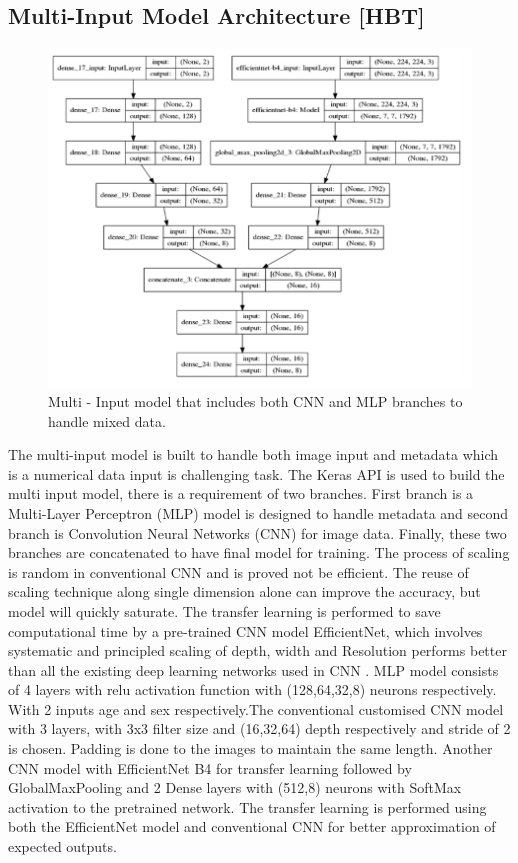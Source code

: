 \subsection{Multi-Input Model Architecture [HBT]}
\begin{figure}[h]
    \centering
    \includegraphics[width=.75\linewidth]{pictures/model.PNG}  
    \caption{Multi - Input model that includes both CNN and MLP branches to handle mixed data.}
    \label{fig:model}
\end{figure}
The multi-input model is built to handle both image input and metadata which is a numerical data input is challenging task. The Keras API is used to build the multi input model, there is a requirement of two branches. First branch is a Multi-Layer Perceptron (MLP) model is designed to handle metadata and second branch is Convolution Neural Networks (CNN) for image data. Finally, these two branches are concatenated to have final model for training. The process of scaling is random in conventional CNN and is proved not be efficient. The reuse of scaling technique along single dimension alone can improve the accuracy, but model will quickly saturate\cite{tan2019efficientnet}. The transfer learning is performed to save computational time by a pre-trained CNN model EfficientNet, which involves systematic and principled scaling of depth, width and Resolution performs better than all the existing deep learning networks used in CNN \cite{tan2019efficientnet}.
MLP model consists of 4 layers with relu activation function with (128,64,32,8) neurons respectively. With 2 inputs age and sex respectively.The conventional customised CNN model with 3 layers, with 3x3 filter size and (16,32,64) depth respectively and stride of 2 is chosen. Padding is done to the images to maintain the same length. Another CNN model with EfficientNet B4 for transfer learning followed by GlobalMaxPooling and 2 Dense layers with (512,8) neurons with SoftMax activation to the pretrained network. The transfer learning is performed using both the EfficientNet model and conventional CNN for better approximation of expected outputs. 
